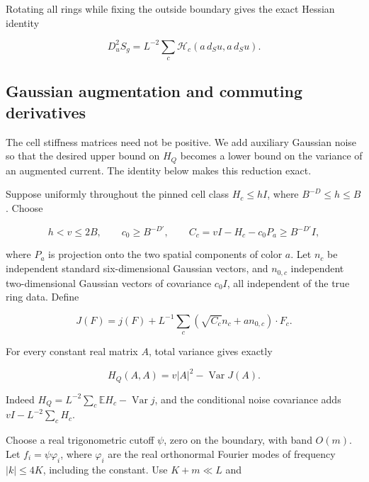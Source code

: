Rotating all rings while fixing the outside boundary gives the exact Hessian identity

\begin{equation}
D_u^2S_g=L^{-2}\sum_c\mathcal H_c(a\,d_Su,a\,d_Su).
\label{eq:pre:3-4}
\end{equation}


\subsection{Gaussian augmentation and commuting derivatives}\label{pre:gaussian}

The cell stiffness matrices need not be positive. We add auxiliary
Gaussian noise so that the desired upper bound on $H_Q$ becomes a lower
bound on the variance of an augmented current. The identity below makes
this reduction exact.

Suppose uniformly throughout the pinned cell class
\(H_c\leq hI\), where \(B^{-D}\leq h\leq B\). Choose

\begin{equation}
h<v\leq2B,\qquad c_0\geq B^{-D'},\qquad
C_c=vI-H_c-c_0P_a\geq B^{-D'}I,
\label{eq:pre:4-1}
\end{equation}

where \(P_a\) is projection onto the two spatial components of color \(a\). Let \(n_c\) be independent standard six-dimensional Gaussian vectors, and \(n_{0,c}\) independent two-dimensional Gaussian vectors of covariance \(c_0I\), all independent of the true ring data. Define

\begin{equation}
J(F)=j(F)+L^{-1}\sum_c(\sqrt{C_c}n_c+a n_{0,c})\cdot F_c.
\label{eq:pre:4-2}
\end{equation}

For every constant real matrix \(A\), total variance gives exactly

\begin{equation}
H_Q(A,A)=v|A|^2-\operatorname{Var}J(A).
\label{eq:pre:4-3}
\end{equation}

Indeed \(H_Q=L^{-2}\sum_c\mathbb EH_c-\operatorname{Var}j\), and the conditional noise covariance adds \(vI-L^{-2}\sum_cH_c\).

Choose a real trigonometric cutoff \(\psi\), zero on the boundary, with band \(O(m)\). Let \(f_i=\psi\varphi_i\), where \(\varphi_i\) are the real orthonormal Fourier modes of frequency \(|k|\leq4K\), including the constant. Use \(K+m\ll L\) and

